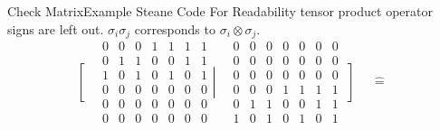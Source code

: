 \begin{frame}{Check Matrix}{Example Steane Code}
    For Readability tensor product operator signs are left out.
    \(\sigma_i\sigma_j\) corresponds to \(\sigma_i\otimes\sigma_j\). \\
    \[
        \left[\begin{matrix}
                  \, \\ \, \\ \, \\ \, \\ \, \\ \,
        \end{matrix}\right.
        \begin{matrix}
            0 & 0 & 0 & 1 & 1 & 1 & 1 \\
            0 & 1 & 1 & 0 & 0 & 1 & 1 \\
            1 & 0 & 1 & 0 & 1 & 0 & 1 \\
            0 & 0 & 0 & 0 & 0 & 0 & 0 \\
            0 & 0 & 0 & 0 & 0 & 0 & 0 \\
            0 & 0 & 0 & 0 & 0 & 0 & 0
        \end{matrix}
        \left|\begin{matrix}
                  \, \\ \, \\ \, \\ \, \\ \, \\ \,
        \end{matrix}\right.
        \begin{matrix}
            0 & 0 & 0 & 0 & 0 & 0 & 0 \\
            0 & 0 & 0 & 0 & 0 & 0 & 0 \\
            0 & 0 & 0 & 0 & 0 & 0 & 0 \\
            0 & 0 & 0 & 1 & 1 & 1 & 1 \\
            0 & 1 & 1 & 0 & 0 & 1 & 1 \\
            1 & 0 & 1 & 0 & 1 & 0 & 1
        \end{matrix}
        \left]\begin{matrix}
                  \, \\ \, \\ \, \\ \, \\ \, \\ \,
        \end{matrix}\right.
        \widehat{=}
        \,\,\,
\]
\end{frame}
